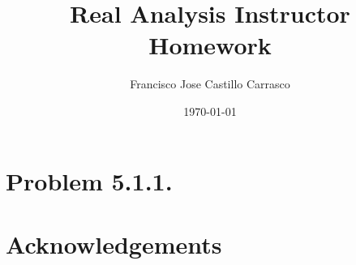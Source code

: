 




\title{Real Analysis Instructor Homework}
\author{Francisco Jose Castillo Carrasco}
\date{\today}
\maketitle




\section{Problem 5.1.1.}


\section*{Acknowledgements}






